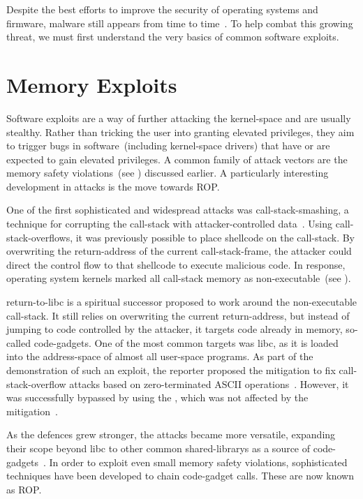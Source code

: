 Despite the best efforts to improve the security of operating systems and firmware,  malware still appears from time to time~\cite{eset-lojax,blacklotus}. To help combat this growing threat, we must first understand the very basics of common software exploits.

\section{Memory Exploits}
\label{sec:mem_exploits}

Software exploits are a way of further attacking the \gls{kernel-space} and are usually stealthy. Rather than tricking the user into granting elevated privileges, they aim to trigger bugs in software~(including \gls{kernel-space} drivers) that have or are expected to gain elevated privileges. A common family of attack vectors are the memory safety violations~(see ) discussed earlier. A particularly interesting development in attacks is the move towards \gls{ROP}.

One of the first sophisticated and widespread attacks was \gls{call-stack-smashing}, a technique for corrupting the \gls{call-stack} with attacker-controlled data~\cite{10.1007/978-3-642-33338-5_5}. Using \glspl{call-stack-overflow}, it was previously possible to place \gls{shellcode} on the \gls{call-stack}. By overwriting the \gls{return-address} of the current \gls{call-stack-frame}, the attacker could direct the control flow to that \gls{shellcode} to execute malicious code. In response, operating system kernels marked all \gls{call-stack} memory as non-executable~(see ).

\Gls{return-to-libc} is a spiritual successor proposed to work around the non-executable \gls{call-stack}. It still relies on overwriting the current \gls{return-address}, but instead of jumping to code controlled by the attacker, it targets code already in memory, so-called \glspl{code-gadget}. One of the most common targets was \gls{libc}, as it is loaded into the \gls{address-space} of almost all \gls{user-space} programs. As part of the demonstration of such an exploit, the reporter proposed the mitigation to fix \gls{call-stack-overflow} attacks based on zero-terminated \gls{ASCII} operations~\cite{libc-zero-byte}. However, it was successfully bypassed by using the , which was not affected by the mitigation~\cite{libc-ex}.

As the defences grew stronger, the attacks became more versatile, expanding their scope beyond \gls{libc} to other common \glspl{shared-library} as a source of \glspl{code-gadget}~\cite{10.1007/978-3-642-33338-5_5}. In order to exploit even small memory safety violations, sophisticated techniques have been developed to chain \gls{code-gadget} calls. These are now known as \gls{ROP}.

